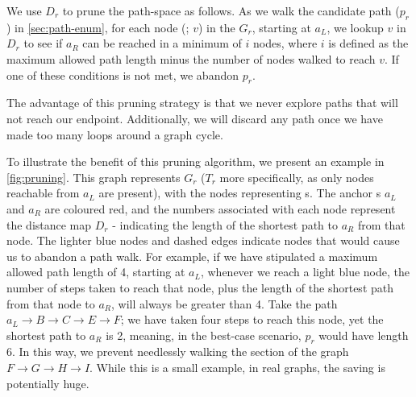 We use $D_r$ to prune the path-space as follows. As we walk the candidate path ($p_r$) in \autoref{sec:path-enum}, for each node (\kmer{}; $v$) in the \dbg{} $G_r$, starting at $a_L$, we lookup $v$ in $D_r$ to see if $a_R$ can be reached in a minimum of $i$ nodes, where $i$ is defined as the maximum allowed path length minus the number of nodes walked to reach $v$. If one of these conditions is not met, we abandon $p_r$. 

The advantage of this pruning strategy is that we never explore paths that will not reach our endpoint. Additionally, we will discard any path once we have made too many loops around a graph cycle.

\noindent
To illustrate the benefit of this pruning algorithm, we present an example in \autoref{fig:pruning}. This graph represents $G_r$ ($T_r$ more specifically, as only nodes reachable from $a_L$ are present), with the nodes representing \kmer{}s. The anchor \kmer{}s $a_L$ and $a_R$ are coloured red, and the numbers associated with each node represent the distance map $D_r$ - indicating the length of the shortest path to $a_R$ from that node. The lighter blue nodes and dashed edges indicate nodes that would cause us to abandon a path walk. For example, if we have stipulated a maximum allowed path length of 4, starting at $a_L$, whenever we reach a light blue node, the number of steps taken to reach that node, plus the length of the shortest path from that node to $a_R$, will always be greater than 4. Take the path $a_L \rightarrow B \rightarrow C \rightarrow E \rightarrow F$; we have taken four steps to reach this node, yet the shortest path to $a_R$ is 2, meaning, in the best-case scenario, $p_r$ would have length 6. In this way, we prevent needlessly walking the section of the graph $F \rightarrow G \rightarrow H \rightarrow I$. While this is a small example, in real graphs, the saving is potentially huge.


